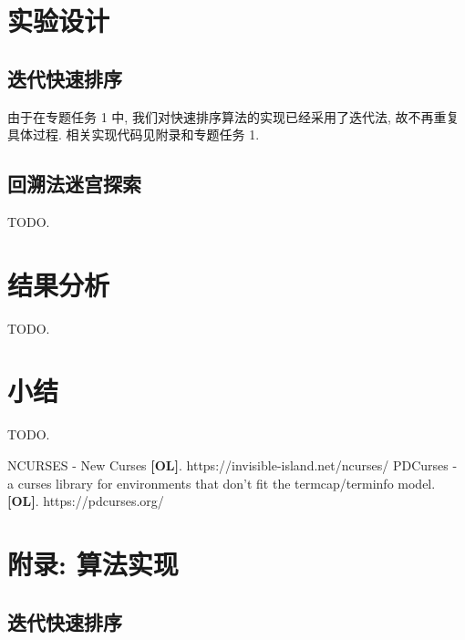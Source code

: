 \documentclass[12pt]{article}
\begin{document}
\section{实验设计}

\subsection{迭代快速排序}

由于在专题任务 1 中, 我们对快速排序算法的实现已经采用了迭代法, 故不再重复具体过程. 相关实现代码见附录和专题任务 1.

\subsection{回溯法迷宫探索}

TODO.

\section{结果分析}

TODO.

\section{小结}

TODO.

\begin{thebibliography}{}

 NCURSES - New Curses \textbf{[OL]}. https://invisible-island.net/ncurses/
 PDCurses - a curses library for environments that don't fit the termcap/terminfo model. \textbf{[OL]}. https://pdcurses.org/

\end{thebibliography}

\appendix

\section{附录: 算法实现}

\subsection{迭代快速排序}
\end{document}
